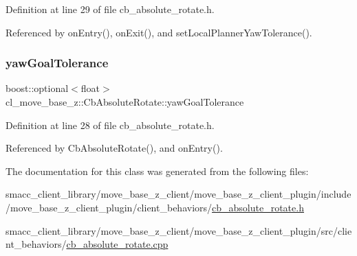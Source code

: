 Definition at line 29 of file cb\+\_\+absolute\+\_\+rotate.\+h.



Referenced by on\+Entry(), on\+Exit(), and set\+Local\+Planner\+Yaw\+Tolerance().

\mbox{\label{classcl__move__base__z_1_1CbAbsoluteRotate_a8d8b5b9c2c821efe101bb07c96c4bdd3}} 
\subsubsection{\texorpdfstring{yaw\+Goal\+Tolerance}{yawGoalTolerance}}
{\footnotesize\ttfamily boost\+::optional$<$float$>$ cl\+\_\+move\+\_\+base\+\_\+z\+::\+Cb\+Absolute\+Rotate\+::yaw\+Goal\+Tolerance}



Definition at line 28 of file cb\+\_\+absolute\+\_\+rotate.\+h.



Referenced by Cb\+Absolute\+Rotate(), and on\+Entry().



The documentation for this class was generated from the following files\+:\begin{DoxyCompactItemize}
\item 
smacc\+\_\+client\+\_\+library/move\+\_\+base\+\_\+z\+\_\+client/move\+\_\+base\+\_\+z\+\_\+client\+\_\+plugin/include/move\+\_\+base\+\_\+z\+\_\+client\+\_\+plugin/client\+\_\+behaviors/\hyperlink{cb__absolute__rotate_8h}{cb\+\_\+absolute\+\_\+rotate.\+h}\item 
smacc\+\_\+client\+\_\+library/move\+\_\+base\+\_\+z\+\_\+client/move\+\_\+base\+\_\+z\+\_\+client\+\_\+plugin/src/client\+\_\+behaviors/\hyperlink{cb__absolute__rotate_8cpp}{cb\+\_\+absolute\+\_\+rotate.\+cpp}\end{DoxyCompactItemize}
